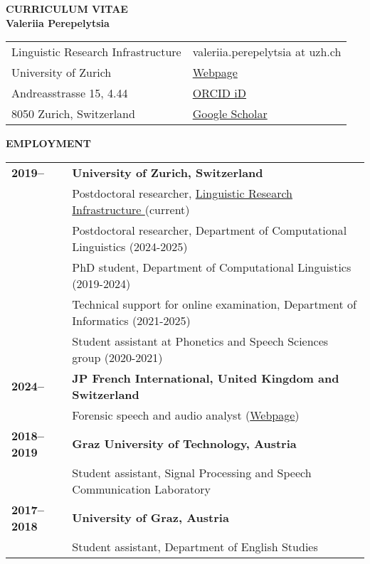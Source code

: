 \documentclass[11pt]{article}
\begin{document}
\begin{center}
{\bf CURRICULUM VITAE\\Valeriia Perepelytsia}\\
\vskip 12pt






\begin{tabular}{ll}
Linguistic Research Infrastructure & valeriia.perepelytsia at uzh.ch \\
University of Zurich & \href{https://www.liri.uzh.ch/en/aboutus/Valeriia-Perepelytsia.html}{Webpage} \\ 
Andreasstrasse 15, 4.44 & \href{https://orcid.org/0009-0003-3355-9580}{ORCID iD} \\
8050 Zurich, Switzerland & \href{https://scholar.google.com/citations?user=9IiY_w8AAAAJ&hl=ru}{Google Scholar} \\
\end{tabular}
\end{center}





\vskip 12pt
\begin{flushleft}
{\bf EMPLOYMENT}
\end{flushleft}
\begin{tabular}{lp{5.5in}}
\bf 2019-- & {\bf University of Zurich, Switzerland} \\
& Postdoctoral researcher, \href{https://www.liri.uzh.ch/}{Linguistic Research Infrastructure }(current) \\
& Postdoctoral researcher, Department of Computational Linguistics (2024-2025) \\
& PhD student, Department of Computational Linguistics (2019-2024) \\
& Technical support for online examination, Department of Informatics (2021-2025) \\
& Student assistant at Phonetics and Speech Sciences group (2020-2021) \\
\bf 2024-- & {\bf JP French International, United Kingdom and Switzerland} \\
& Forensic speech and audio analyst (\href{https://www.jpfrench.com/valeriia-perepelytsia-4/}{Webpage}) \\
\bf 2018--2019 & {\bf Graz University of Technology, Austria} \\
& Student assistant, Signal Processing and Speech Communication Laboratory \\
\bf 2017--2018 & {\bf University of Graz, Austria} \\
& Student assistant, Department of English Studies \\
\end{tabular}
\end{document}
